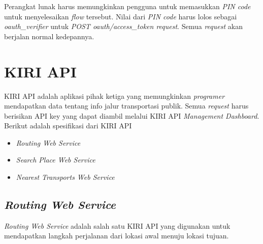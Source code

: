 Perangkat lunak harus memungkinkan pengguna untuk memasukkan \textit{PIN code} untuk menyelesaikan \textit{flow} tersebut. Nilai dari \textit{PIN code} harus lolos sebagai \textit{oauth\_verifier} untuk \textit{POST oauth/access\_token request}. Semua \textit{request} akan berjalan normal kedepannya.




\section{KIRI API}
KIRI API adalah aplikasi pihak ketiga yang memungkinkan \textit{programer} mendapatkan data tentang info jalur transportasi publik. Semua \textit{request} harus berisikan API key yang dapat diambil melalui KIRI API \textit{Management Dashboard}. Berikut adalah spesifikasi dari KIRI API

\begin{itemize}
	\item \textit{Routing Web Service}
	\item \textit{Search Place Web Service}
	\item \textit{Nearest Transports Web Service}
\end{itemize}

\subsection{\textit{Routing Web Service}}
\textit{Routing Web Service} adalah salah satu KIRI API yang digunakan untuk mendapatkan langkah perjalanan dari lokasi awal menuju lokasi tujuan.

